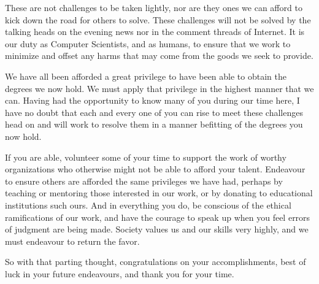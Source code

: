 \documentclass[11pt,twocolumn,letterpaper]{article}
\begin{document}
These are not challenges to be taken lightly, nor are they ones we can
afford to kick down the road for others to solve. These challenges
will not be solved by the talking heads on the evening news nor in the
comment threads of Internet. It is our duty as Computer Scientists,
and as humans, to ensure that we work to minimize and offset any harms
that may come from the goods we seek to provide.

We have all been afforded a great privilege to have been able to
obtain the degrees we now hold. We must apply that privilege in the
highest manner that we can. Having had the opportunity to know many
of you during our time here, I have no doubt that each and every one
of you can rise to meet these challenges head on and will work to
resolve them in a manner befitting of the degrees you now hold.

If you are able, volunteer some of your time to support the work of
worthy organizations who otherwise might not be able to afford your
talent. Endeavour to ensure others are afforded the same privileges we
have had, perhaps by teaching or mentoring those interested in our
work, or by donating to educational institutions such ours. And in
everything you do, be conscious of the ethical ramifications of our
work, and have the courage to speak up when you feel errors of
judgment are being made. Society values us and our skills very highly,
and we must endeavour to return the favor.

So with that parting thought, congratulations on your accomplishments,
best of luck in your future endeavours, and thank you for your time.
\end{document}
